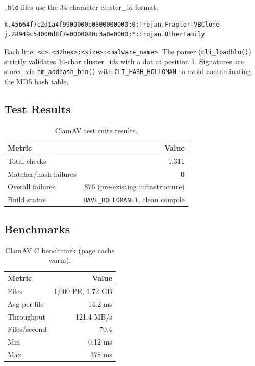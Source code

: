 \documentclass[11pt,a4paper]{article}
\begin{document}
\texttt{.hlo} files use the 34-character cluster\_id format:

\begin{lstlisting}
k.45664f7c2d1a4f9900000b0800000000:0:Trojan.Fragtor-VBClone
j.28949c54000d8f7e0000080c3a0e0000:*:Trojan.OtherFamily
\end{lstlisting}

Each line: \texttt{<c>.<32hex>:<size>:<malware\_name>}.  The parser
(\texttt{cli\_loadhlo()}) strictly validates 34-char cluster\_ids with a dot
at position 1.  Signatures are stored via \texttt{hm\_addhash\_bin()} with
\texttt{CLI\_HASH\_HOLLOMAN} to avoid contaminating the MD5 hash table.

\subsection{Test Results}

\begin{table}[h]
\centering
\begin{tabular}{lr}
\toprule
Metric & Value \\
\midrule
Total checks & 1,311 \\
Matcher/hash failures & \textbf{0} \\
Overall failures & 876 (pre-existing infrastructure) \\
Build status & \texttt{HAVE\_HOLLOMAN=1}, clean compile \\
\bottomrule
\end{tabular}
\caption{ClamAV test suite results.}
\label{tab:clamav-tests}
\end{table}

\subsection{Benchmarks}

\begin{table}[h]
\centering
\begin{tabular}{lr}
\toprule
Metric & Value \\
\midrule
Files & 1,000 PE, 1.72 GB \\
Avg per file & 14.2 ms \\
Throughput & 121.4 MB/s \\
Files/second & 70.4 \\
Min & 0.12 ms \\
Max & 378 ms \\
\bottomrule
\end{tabular}
\caption{ClamAV C benchmark (page cache warm).}
\label{tab:clamav-bench}
\end{table}
\end{document}
